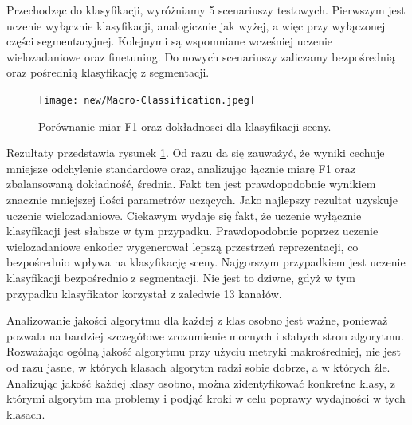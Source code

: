 \vspace{0.5cm}
Przechodząc do klasyfikacji, wyróżniamy 5 scenariuszy testowych. Pierwszym jest uczenie wyłącznie klasyfikacji, analogicznie jak wyżej, a więc przy wyłączonej części segmentacyjnej. Kolejnymi są wspomniane wcześniej uczenie wielozadaniowe oraz finetuning. Do nowych scenariuszy zaliczamy bezpośrednią oraz pośrednią klasyfikację z segmentacji.
\begin{figure}[ht!]
    \centering
    \texttt{[image: new/Macro-Classification.jpeg]}
    \caption{Porównanie miar F1 oraz dokładnosci dla klasyfikacji sceny.}
    \label{fig:macro-classification}
\end{figure}

Rezultaty przedstawia rysunek \ref{fig:macro-classification}. Od razu da się zauważyć, że wyniki cechuje mniejsze odchylenie standardowe oraz, analizując łącznie miarę F1 oraz zbalansowaną dokładność, średnia. Fakt ten jest prawdopodobnie wynikiem znacznie mniejszej ilości parametrów uczących. Jako najlepszy rezultat uzyskuje uczenie wielozadaniowe. Ciekawym wydaje się fakt, że uczenie wyłącznie klasyfikacji jest słabsze w tym przypadku. Prawdopodobnie poprzez uczenie wielozadaniowe enkoder wygenerował lepszą przestrzeń reprezentacji, co bezpośrednio wpływa na klasyfikację sceny. Najgorszym przypadkiem jest uczenie klasyfikacji bezpośrednio z segmentacji. Nie jest to dziwne, gdyż w tym przypadku klasyfikator korzystał z zaledwie 13 kanałów.
\vspace{0.5cm}

Analizowanie jakości algorytmu dla każdej z klas osobno jest ważne, ponieważ pozwala na bardziej szczegółowe zrozumienie mocnych i słabych stron algorytmu. Rozważając ogólną jakość algorytmu przy użyciu metryki makrośredniej, nie jest od razu jasne, w których klasach algorytm radzi sobie dobrze, a w których źle. Analizując jakość każdej klasy osobno, można zidentyfikować konkretne klasy, z którymi algorytm ma problemy i podjąć kroki w celu poprawy wydajności w tych klasach.

